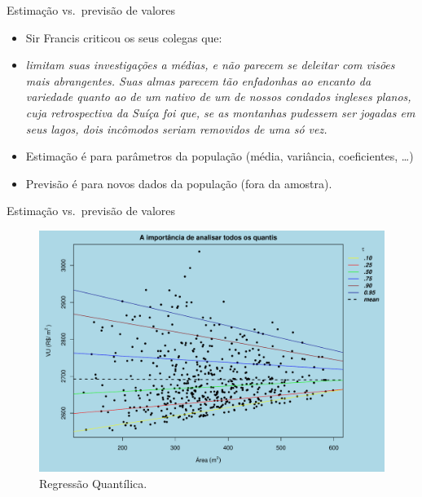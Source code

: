 \documentclass[9pt,ignorenonframetext,aspectratio=169]{beamer}
\providecommand{\tightlist}{%
  \setlength{\itemsep}{0pt}\setlength{\parskip}{0pt}}
\begin{document}
\begin{frame}{Estimação vs.~previsão de valores}
\protect\hypertarget{estimauxe7uxe3o-vs.-previsuxe3o-de-valores}{}

\begin{itemize}[<+->]
\tightlist
\item
  Sir Francis \textcite[p.~62]{galton}
  \autocite[\emph{apud}][p.~350]{koenker2000} criticou os seus colegas
  que:
\item
  \emph{limitam suas investigações a médias, e não parecem se deleitar com visões
  mais abrangentes. Suas almas parecem tão enfadonhas ao encanto da variedade 
  quanto ao de um nativo de um de nossos condados ingleses planos, cuja 
  retrospectiva da Suíça foi que, se as montanhas pudessem ser jogadas em seus 
  lagos, dois incômodos seriam removidos de uma só vez.}
\item
  Estimação é para parâmetros da população (média, variância,
  coeficientes, \ldots)
\item
  Previsão é para novos dados da população (fora da amostra).
\end{itemize}

\end{frame}

\begin{frame}{Estimação vs.~previsão de valores}
\protect\hypertarget{estimauxe7uxe3o-vs.-previsuxe3o-de-valores-1}{}

\begin{figure}

{\centering \includegraphics[width=0.5\linewidth]{index_files/figure-beamer/qr-1} 

}

\caption{Regressão Quantílica.}\label{fig:qr}
\end{figure}

\end{frame}
\end{document}
